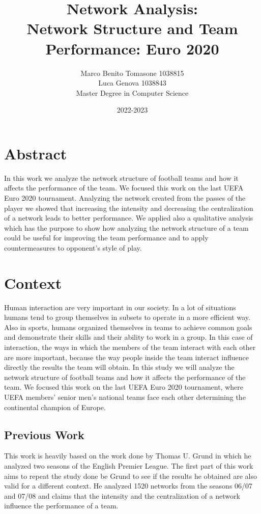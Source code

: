 \documentclass[12pt, a4paper]{article}
\author{Marco Benito Tomasone 1038815 \\ 
        Luca Genova  1038843\\
 Master Degree in Computer Science\\}
\date{2022-2023}
\title{Network Analysis:\\ Network Structure and Team Performance: Euro 2020}
\begin{document}
\maketitle

\section{Abstract}
\label{abstract}
In this work we analyze the network structure of football teams and how it affects the performance of the team. We focused this work on the last UEFA Euro 2020 tournament. Analyzing the network created from the passes of the player we showed that increasing the intensity and decreasing the centralization of a network leads to better performance. We applied also a qualitative analysis which has the purpose to show how analyzing the network structure of a team could be useful for improving the team performance and to apply countermeasures to opponent's style of play.\\

\section{Context}
\label{context}
Human interaction are very important in our society. In a lot of situations humans tend to group themselves in subsets to operate in a more efficient way. Also in sports, humans organized themselves in teams to achieve common goals and demonstrate their skills and their ability to work in a group. In this case of interaction, the ways in which the members of the team interact with each other are more important, because the way people inside the team interact influence directly the results the team will obtain. In this study we will analyze the network structure of football teams and how it affects the performance of the team. We focused this work on the last UEFA Euro 2020 tournament, where UEFA members' senior men's national teams face each other determining the continental champion of Europe. 
\subsection{Previous Work}
This work is heavily based on the work done by Thomas U. Grund \cite{GRUND} in which he analyzed two seasons of the English Premier League. 
The first part of this work aims to repeat the study done be Grund to see if the results he obtained are also valid for a different context. He analyzed 1520 networks from the seasons 06/07 and 07/08 and claims that the intensity and the centralization of a network influence the performance of a team.\\ 
\end{document}
